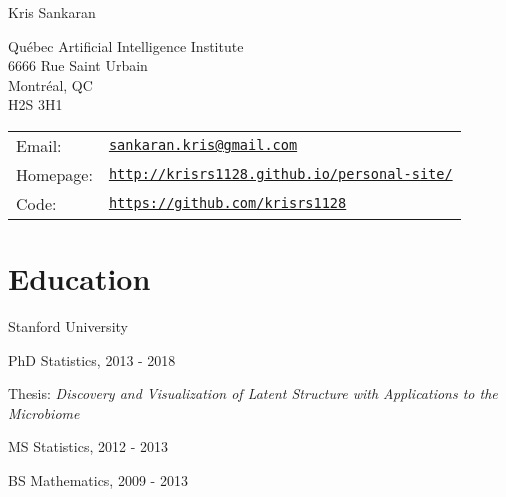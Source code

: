 \documentclass[letterpaper]{article}
\def\name{Kris Sankaran}
\renewenvironment{itemize}{
  \begin{list}{}{
    \setlength{\leftmargin}{1.5em}
  }
}{
  \end{list}
}
\begin{document}
{\huge \name}


\vspace{0.25in}

\begin{minipage}{0.45\linewidth}
  Qu\'ebec Artificial Intelligence Institute \\
  6666 Rue Saint Urbain \\
  Montr\'eal, QC \\
  H2S 3H1
\end{minipage}
\begin{minipage}{0.45\linewidth}
  \begin{tabular}{ll}
    Email: & \href{mailto:sankaran.kris@gmail.com}{\tt sankaran.kris@gmail.com} \\
    Homepage: & \href{http://krisrs1128.github.io/personal-site/}{\tt http://krisrs1128.github.io/personal-site/} \\
    Code: & \href{https://github.com/krisrs1128}{\tt https://github.com/krisrs1128}
  \end{tabular}
\end{minipage}

\section*{Education}
Stanford University
\begin{itemize}
  \item PhD Statistics, 2013 - 2018
    \begin{itemize}
    \item Thesis: \textit{Discovery and Visualization of Latent Structure with Applications to the Microbiome}
    \end{itemize}
  \item MS Statistics, 2012 - 2013
  \item BS Mathematics, 2009 - 2013
\end{itemize}
\end{document}
